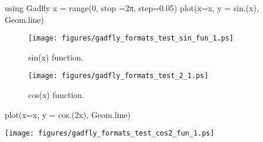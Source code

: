 \begin{juliacode}
using Gadfly
x = range(0, stop =2π, step=0.05)
plot(x=x, y = sin.(x), Geom.line)
\end{juliacode}
\begin{figure}[ht]
\center
\texttt{[image: figures/gadfly\_formats\_test\_sin\_fun\_1.ps]}
\caption{sin(x) function.}
\label{fig:sin_fun}
\end{figure}

\begin{figure}[htpb]
\center
\texttt{[image: figures/gadfly\_formats\_test\_2\_1.ps]}
\caption{cos(x) function.}
\end{figure}

\begin{juliacode}
plot(x=x, y = cos.(2x), Geom.line)
\end{juliacode}
\texttt{[image: figures/gadfly\_formats\_test\_cos2\_fun\_1.ps]}

